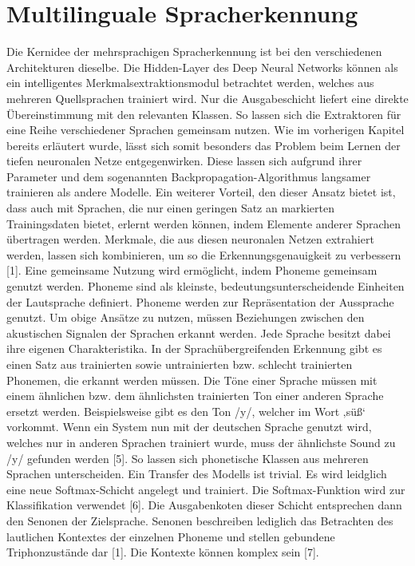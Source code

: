 \section{Multilinguale Spracherkennung}
Die Kernidee der mehrsprachigen Spracherkennung ist bei den verschiedenen Architekturen dieselbe. Die Hidden-Layer des Deep Neural Networks können als ein intelligentes Merkmalsextraktionsmodul betrachtet werden, welches aus mehreren Quellsprachen trainiert wird. Nur die Ausgabeschicht liefert eine direkte Übereinstimmung mit den relevanten Klassen. So lassen sich die Extraktoren für eine Reihe verschiedener Sprachen gemeinsam nutzen. Wie im vorherigen Kapitel bereits erläutert wurde, lässt sich somit besonders das Problem beim Lernen der tiefen neuronalen Netze entgegenwirken. Diese lassen sich aufgrund ihrer Parameter und dem sogenannten Backpropagation-Algorithmus langsamer trainieren als andere Modelle. Ein weiterer Vorteil, den dieser Ansatz bietet ist, dass auch mit Sprachen, die nur einen geringen Satz an markierten Trainingsdaten bietet, erlernt werden können, indem Elemente anderer Sprachen übertragen werden. Merkmale, die aus diesen neuronalen Netzen extrahiert werden, lassen sich kombinieren, um so die Erkennungsgenauigkeit zu verbessern [1].
Eine gemeinsame Nutzung wird ermöglicht, indem Phoneme gemeinsam genutzt werden. Phoneme sind als kleinste, bedeutungsunterscheidende Einheiten der Lautsprache definiert. Phoneme werden zur Repräsentation der Aussprache genutzt. Um obige Ansätze zu nutzen, müssen Beziehungen zwischen den akustischen Signalen der Sprachen erkannt werden. Jede Sprache besitzt dabei ihre eigenen Charakteristika. In der Sprachübergreifenden Erkennung gibt es einen Satz aus trainierten sowie untrainierten bzw. schlecht trainierten Phonemen, die erkannt werden müssen. Die Töne einer Sprache müssen mit einem ähnlichen bzw. dem ähnlichsten trainierten Ton einer anderen Sprache ersetzt werden. Beispielsweise gibt es den Ton /y/, welcher im Wort ‚süß‘ vorkommt. Wenn ein System nun mit der deutschen Sprache genutzt wird, welches nur in anderen Sprachen trainiert wurde, muss der ähnlichste Sound zu /y/ gefunden werden [5]. So lassen sich phonetische Klassen aus mehreren Sprachen unterscheiden. Ein Transfer des Modells ist trivial. Es wird leidglich eine neue Softmax-Schicht angelegt und trainiert. Die Softmax-Funktion wird zur Klassifikation verwendet [6]. Die Ausgabenkoten dieser Schicht entsprechen dann den Senonen der Zielsprache. Senonen beschreiben lediglich das Betrachten des lautlichen Kontextes der einzelnen Phoneme und stellen gebundene Triphonzustände dar [1]. Die Kontexte können komplex sein [7]. 
